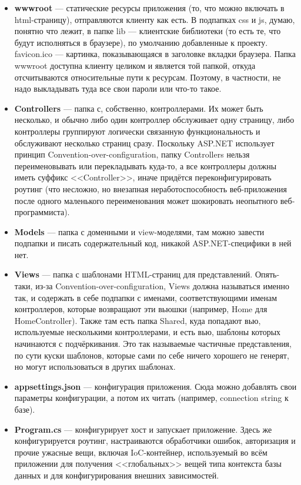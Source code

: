 \documentclass[a5paper]{article}
\begin{document}
\begin{itemize}
    \item \textbf{wwwroot} --- статические ресурсы приложения (то, что можно включать в html-страницу), отправляются клиенту как есть. В подпапках css и js, думаю, понятно что лежит, в папке lib --- клиентские библиотеки (то есть те, что будут исполняться в браузере), по умолчанию добавленные к проекту. favicon.ico --- картинка, показывающаяся в заголовке вкладки браузера. Папка wwwroot доступна клиенту целиком и является той папкой, откуда отсчитываются относительные пути к ресурсам. Поэтому, в частности, не надо выкладывать туда все свои пароли или что-то такое.
    \item \textbf{Controllers} --- папка с, собственно, контроллерами. Их может быть несколько, и обычно либо один контроллер обслуживает одну страницу, либо контроллеры группируют логически связанную функциональность и обслуживают несколько страниц сразу. Поскольку ASP.NET использует принцип Convention-over-configuration, папку Controllers нельзя переименовывать или перекладывать куда-то, а все контроллеры должны иметь суффикс <<Controller>>, иначе придётся переконфигурировать роутинг (что несложно, но внезапная неработоспособность веб-приложения после одного маленького переименования может шокировать неопытного веб-программиста).
    \item \textbf{Models} --- папка с доменными и view-моделями, там можно завести подпапки и писать содержательный код, никакой ASP.NET-специфики в ней нет.
    \item \textbf{Views} --- папка с шаблонами HTML-страниц для представлений. Опять-таки, из-за Convention-over-configuration, Views должна называться именно так, и содержать в себе подпапки с именами, соответствующими именам контроллеров, которые возвращают эти вьюшки (например, Home для HomeController). Также там есть папка Shared, куда попадают вью, используемые несколькими контроллерами, и есть вью, шаблоны которых начинаются с подчёркивания. Это так называемые частичные представления, по сути куски шаблонов, которые сами по себе ничего хорошего не генерят, но могут использоваться в других шаблонах.
    \item \textbf{appsettings.json} --- конфигурация приложения. Сюда можно добавлять свои параметры конфигурации, а потом их читать (например, connection string к базе).
    \item \textbf{Program.cs} --- конфигурирует хост и запускает приложение. Здесь же конфигурируется роутинг, настраиваются обработчики ошибок, авторизация и прочие ужасные вещи, включая IoC-контейнер, используемый во всём приложении для получения <<глобальных>> вещей типа контекста базы данных и для конфигурирования внешних зависимостей.
\end{itemize}
\end{document}
